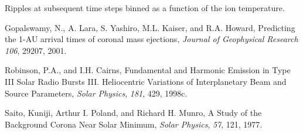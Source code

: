 \documentclass[12pt,a4paper]{article}
\begin{document}
  \vspace{0.5cm}
   
  \setlength{\temptextwidth}{\textwidth}  
  \addtolength{\temptextwidth}{-1.0\parindent}
    
    \parbox[t]{\temptextwidth}{Ripples at subsequent time steps binned as a function of the ion 
                               temperature.}



\begin{thebibliography}{}

 Gopalswamy, N., A. Lara, S. Yashiro, M.L. Kaiser, 
and R.A. Howard, 
Predicting the 1-AU arrival times of coronal mass ejections, 
{\it Journal of Geophysical Research} {\it 106}, 29207, 2001.


 Robinson, P.A., and I.H. Cairns, 
Fundamental and Harmonic Emission in Type III Solar Radio Bursts 
III. Heliocentric Variations of Interplanetary Beam and Source 
Parameters, 
{\it Solar Physics}, {\it 181}, 429, 1998c.


Saito, Kuniji, Arthur I. Poland, and Richard H. Munro, 
A Study of the Background Corona Near Solar Minimum, 
{\it Solar Physics}, {\it 57}, 121, 1977.
\end{thebibliography}
\end{document}
